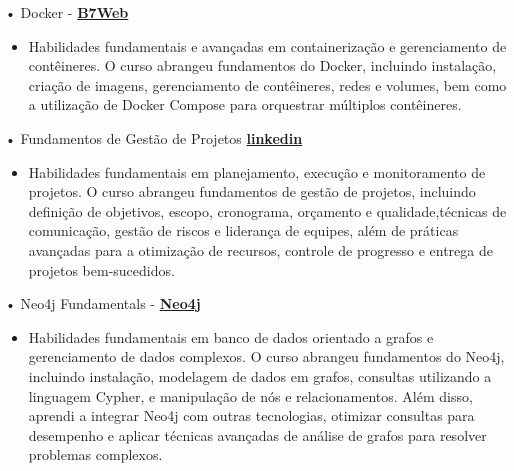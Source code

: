 \documentclass[a4paper]{article}
\begin{document}
\vspace*{1mm}
• Docker - \textbf{\href{https://drive.google.com/drive/folders/1YKThgvnT5h1bA_Hb0uDiIf7p8Qiph-NC}{B7Web}}\\
\begin{itemize}
    \item [] Habilidades fundamentais e avançadas em containerização e gerenciamento de contêineres. O curso abrangeu fundamentos do Docker, incluindo instalação, criação de imagens, gerenciamento de contêineres, redes e volumes, bem como a utilização de
          Docker Compose para orquestrar múltiplos contêineres.
\end{itemize}
\vspace*{1mm}
• Fundamentos de Gestão de Projetos \textbf{\href{https://www.linkedin.com/learning/certificates/0fc1a744c87dc72f53e8c694fd58809808a183327167377cb224c1ac43e732b6}{linkedin}}\\
\begin{itemize}
    \item [] Habilidades fundamentais em planejamento, execução e monitoramento de projetos. O curso abrangeu fundamentos de gestão de projetos, incluindo definição de objetivos, escopo, cronograma, orçamento e qualidade,técnicas de comunicação, gestão de riscos e liderança de equipes, além de práticas avançadas para a otimização de recursos, controle de progresso e entrega de projetos bem-sucedidos.
\end{itemize}
\vspace*{1mm}
• Neo4j Fundamentals - \textbf{\href{https://graphacademy.neo4j.com/c/9d25b359-5995-4053-8475-7b2bf61f163e/}{Neo4j}}\\
\begin{itemize} \itemsep -3pt
    \item[] Habilidades fundamentais em banco de dados orientado a grafos e gerenciamento de dados complexos. O curso abrangeu fundamentos do Neo4j, incluindo instalação, modelagem de dados em grafos, consultas utilizando a linguagem Cypher, e manipulação de nós e relacionamentos. Além disso, aprendi a integrar Neo4j com outras tecnologias, otimizar consultas para desempenho e aplicar técnicas avançadas de análise de grafos para resolver problemas complexos.
\end{itemize}
\vspace{2mm}

\
\end{document}
